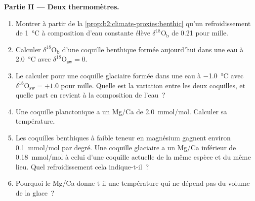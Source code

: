 \begin{problem}
\medskip\noindent\textbf{Partie II --- Deux thermomètres.}
\begin{enumerate}[resume]
  \item Montrer à partir de la \cref{prop:b2:climate-proxies:benthic} qu'un refroidissement de \qty{1}{\celsius} à composition d'eau constante élève
        $\delta^{18}\mathrm{O}_{\mathrm{b}}$ de \num{0.21} pour mille.
  \item Calculer $\delta^{18}\mathrm{O}_{\mathrm{b}}$ d'une coquille benthique formée aujourd'hui dans une eau à
        \qty{2.0}{\celsius} avec $\delta^{18}\mathrm{O}_{\mathrm{sw}} = 0$.
  \item Le calculer pour une coquille glaciaire formée dans une eau à \qty{-1.0}{\celsius} avec
        $\delta^{18}\mathrm{O}_{\mathrm{sw}} = +1.0$ pour mille. Quelle est la variation entre les deux
        coquilles, et quelle part en revient à la composition de l'eau~?
  \item Une coquille planctonique a un Mg/Ca de \qty{2.0}{mmol/mol}. Calculer sa température.
  \item Les coquilles benthiques à faible teneur en magnésium gagnent environ \qty{0.1}{mmol/mol} par degré. Une coquille glaciaire a
        un Mg/Ca inférieur de \qty{0.18}{mmol/mol} à celui d'une coquille actuelle de la même espèce et du même lieu.
        Quel refroidissement cela indique-t-il~?
  \item Pourquoi le Mg/Ca donne-t-il une température qui ne dépend pas du volume de la glace~?
\end{enumerate}


\end{problem}
